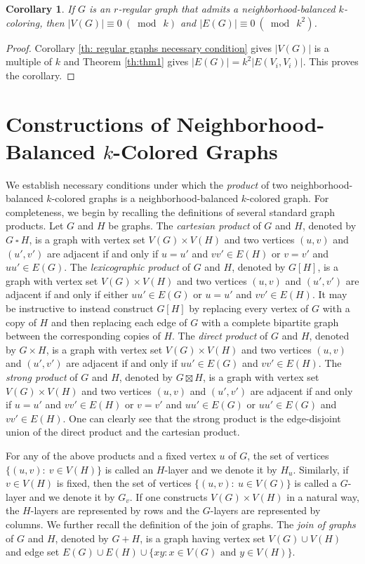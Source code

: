 \documentclass[12pt]{article}
\newtheorem{corollary}[theorem]{Corollary}
\newcommand{\nbc}{neighborhood-balanced $k$-coloring\xspace}
\newcommand{\nbcd}{neighborhood-balanced $k$-colored\xspace}
\begin{document}
\begin{corollary}\label{order and size condition}
    If $G$ is an $r$-regular graph that admits a \nbc, then $|V(G)| \equiv 0\ (\bmod\ k)$ and $|E(G)| \equiv 0\ (\bmod\ {k^2})$.
\end{corollary}

\begin{proof}
    Corollary \ref{th: regular graphs necessary condition} gives $|V(G)|$ is a multiple of $k$ and Theorem \ref{th:thm1} gives $|E(G)|=k^2|E(V_i, V_i)|$.
    This proves the corollary.
\end{proof}


\section{Constructions of Neighborhood-Balanced $k$-Colored Graphs}\label{sec:operations}
We establish necessary conditions under which the {\it product} of two \nbcd graphs is a \nbcd graph.
For completeness, we begin by recalling the definitions of several standard graph products.
Let $G$ and $H$ be graphs.
The {\it cartesian product}  of $G$ and $H$, denoted by $G\ \square \ H$, is a graph with vertex set $V(G)\times V(H)$ and two vertices $(u,v)$ and $(u',v')$ are adjacent if and only if $u=u'$ and $vv'\in E(H)$  or $v=v'$ and $uu'\in E(G)$.
The {\it lexicographic product} of $G$ and $H$, denoted by $G[H]$, is a graph with vertex set $V(G)\times V(H)$ and two vertices $(u,v)$ and $(u',v')$ are adjacent if and only if either $uu'\in E(G)$ or $u=u'$ and $vv'\in E(H)$.
It may be instructive to instead construct $G[H]$ by replacing every vertex of $G$ with a copy of $H$ and then replacing each edge of $G$ with a complete bipartite graph between the corresponding copies of $H$.
The {\it direct product} of $G$ and $H$, denoted by $G\times H$, is a graph with vertex set $V(G)\times V(H)$ and two vertices $(u,v)$ and $(u',v')$ are adjacent if and only if $uu'\in E(G)$ and $vv'\in E(H)$.
The {\it strong product} of $G$ and $H$, denoted by $G \boxtimes H$, is a graph with vertex set $V(G)\times V(H)$ and two vertices $(u,v)$ and $(u',v')$ are adjacent if and only if $u=u'$ and $vv'\in E(H)$ or $v=v'$ and $uu'\in E(G)$ or $uu'\in E(G)$ and $vv'\in E(H)$.
    One can clearly see that the strong product is the edge-disjoint union of the direct product and the cartesian product.
    
For any of the above products and a fixed vertex $u$ of $G$, the set of vertices $\{(u,v):\ v\in V(H)\}$ is called an $H$-layer and we denote it by $H_u$. Similarly, if $v\in V(H)$ is fixed, then the set of vertices $\{(u,v):\ u\in V(G)\}$ is called a $G$-layer and we denote it by $G_v$.
If one constructs $V(G)\times V(H)$ in a natural way, the $H$-layers are represented by rows and the $G$-layers are represented by columns.
We further recall the definition of the join of graphs.
The {\it join of graphs} of $G$ and $H$, denoted by $G+H$, is a graph having vertex set $V(G)\cup V(H)$ and edge set $E(G)\cup E(H)\cup \{xy:  x\in V(G) \text{ and } y \in V(H)\}$.
\end{document}
